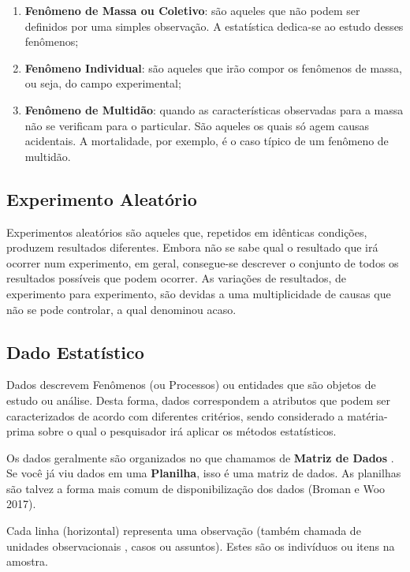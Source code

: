 \begin{enumerate}
  \item \textbf{Fenômeno de Massa ou Coletivo}: são aqueles que não podem ser definidos por uma simples observação. A estatística dedica-se ao estudo desses fenômenos;
  \item \textbf{Fenômeno Individual}: são aqueles que irão compor os fenômenos de massa, ou seja, do campo experimental;
  \item \textbf{Fenômeno de Multidão}: quando as características observadas para a massa não se verificam para o particular. São aqueles os quais só agem causas acidentais. A mortalidade, por exemplo, é o caso típico de um fenômeno de multidão.
\end{enumerate}


\subsection{Experimento Aleatório}

\inic Experimentos aleatórios são aqueles que, repetidos em idênticas condições, produzem resultados diferentes. Embora não se sabe qual o resultado que irá ocorrer num experimento, em geral, consegue-se descrever o conjunto de todos os resultados possíveis que podem ocorrer. As variações de resultados, de experimento para experimento, são devidas a uma multiplicidade de causas que não se pode controlar, a qual denominou acaso.

\subsection{Dado Estatístico}

Dados descrevem Fenômenos (ou Processos) ou entidades que são objetos de estudo ou análise. Desta forma, dados correspondem a atributos que podem ser caracterizados de acordo com diferentes critérios, sendo considerado a matéria-prima sobre o qual o pesquisador irá aplicar os métodos estatísticos.\vskip0.3cm

Os dados geralmente são organizados no que chamamos de \textbf{Matriz de Dados} . Se você já viu dados em uma \textbf{Planilha}, isso é uma matriz de dados. As planilhas são talvez a forma mais comum de disponibilização dos dados (Broman e Woo 2017).\vskip0.3cm



Cada linha (horizontal) representa uma observação (também chamada de unidades observacionais , casos ou assuntos). Estes são os indivíduos ou itens na amostra.\vskip0.3cm

